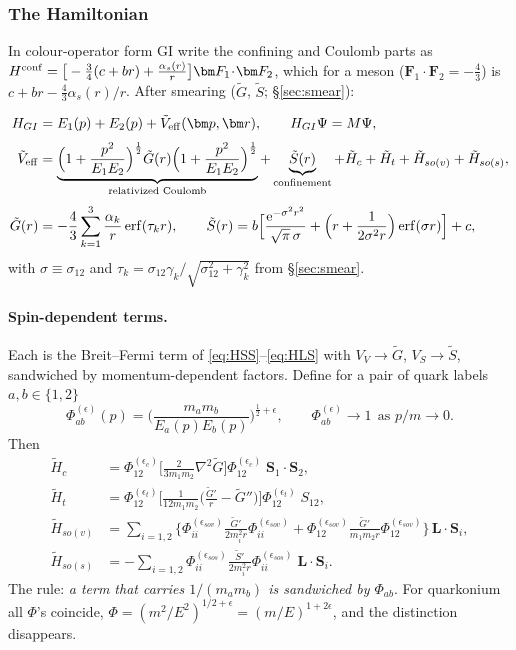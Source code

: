 \documentclass[11pt,a4paper]{article}
\numberwithin{equation}{section}
\theoremstyle{definition}
\theoremstyle{plain}
\theoremstyle{remark}
\newenvironment{keyresult}[1][Key result]{\begin{tcolorbox}[keybox,title={\small\bfseries #1},fonttitle=\small,coltitle=white,colbacktitle=MidnightBlue!70]}{\end{tcolorbox}}
\numberwithin{algorithm}{section}
\newcommand{\vr}{\bm r}
\newcommand{\vp}{\bm p}
\newcommand{\vL}{\bm L}
\newcommand{\vS}{\bm S}
\newcommand{\vF}{\bm F}
\newcommand{\as}{\alpha_s}
\newcommand{\ee}{\mathrm{e}}
\newcommand{\erf}{\operatorname{erf}}
\begin{document}
\subsubsection{The Hamiltonian}
In colour-operator form GI write the confining and Coulomb parts as
$H^{\rm conf}=\big[-\tfrac34(c+br)+\frac{\as(r)}{r}\big]\vF_1\!\cdot\!\vF_2$, which for a meson ($\vF_1\!\cdot\!\vF_2=-\tfrac43$) is $c+br-\tfrac43\as(r)/r$.
After smearing ($\tilde G$, $\tilde S$; \S\ref{sec:smear}):
\begin{keyresult}[Model C: Godfrey--Isgur Hamiltonian, meson rest frame]
\begin{align}
H_{GI}&=E_1(p)+E_2(p)+\tilde V_{\rm eff}(\vp,\vr),\qquad H_{GI}\Psi=M\Psi,\label{eq:HGI}\\[1mm]
\tilde V_{\rm eff}&=\underbrace{\Big(1+\frac{p^2}{E_1E_2}\Big)^{\frac12}\tilde G(r)\Big(1+\frac{p^2}{E_1E_2}\Big)^{\frac12}}_{\text{relativized Coulomb}}
+\underbrace{\tilde S(r)}_{\text{confinement}}
+\tilde H_{c}+\tilde H_{t}+\tilde H_{so(v)}+\tilde H_{so(s)},\\[1mm]
\tilde G(r)&=-\frac43\sum_{k=1}^3\frac{\alpha_k}{r}\erf(\tau_kr),\qquad
\tilde S(r)=b\Big[\frac{\ee^{-\sigma^2r^2}}{\sqrt\pi\,\sigma}+\Big(r+\frac{1}{2\sigma^2r}\Big)\erf(\sigma r)\Big]+c,
\end{align}
with $\sigma\equiv\sigma_{12}$ and $\tau_k=\sigma_{12}\gamma_k/\sqrt{\sigma_{12}^2+\gamma_k^2}$ from \S\ref{sec:smear}.
\end{keyresult}

\paragraph{Spin-dependent terms.} Each is the Breit--Fermi term of \eqref{eq:HSS}--\eqref{eq:HLS} with $V_V\to\tilde G$, $V_S\to\tilde S$, sandwiched by momentum-dependent factors. Define for a pair of quark labels $a,b\in\{1,2\}$
\begin{equation}
\Phi^{(\epsilon)}_{ab}(p)=\Big(\frac{m_am_b}{E_a(p)E_b(p)}\Big)^{\frac12+\epsilon},\qquad \Phi^{(\epsilon)}_{ab}\to1\ \ \text{as }p/m\to0.
\end{equation}
Then
\begin{align}
\tilde H_c&=\Phi^{(\epsilon_c)}_{12}\Big[\frac{2}{3m_1m_2}\nabla^2\tilde G\Big]\Phi^{(\epsilon_c)}_{12}\;\vS_1\!\cdot\!\vS_2,\\
\tilde H_t&=\Phi^{(\epsilon_t)}_{12}\Big[\frac{1}{12m_1m_2}\Big(\frac{\tilde G'}{r}-\tilde G''\Big)\Big]\Phi^{(\epsilon_t)}_{12}\;S_{12},\\
\tilde H_{so(v)}&=\sum_{i=1,2}\Big\{\Phi^{(\epsilon_{sov})}_{ii}\frac{\tilde G'}{2m_i^2r}\Phi^{(\epsilon_{sov})}_{ii}+\Phi^{(\epsilon_{sov})}_{12}\frac{\tilde G'}{m_1m_2r}\Phi^{(\epsilon_{sov})}_{12}\Big\}\,\vL\!\cdot\!\vS_i,\\
\tilde H_{so(s)}&=-\sum_{i=1,2}\Phi^{(\epsilon_{sos})}_{ii}\frac{\tilde S'}{2m_i^2r}\Phi^{(\epsilon_{sos})}_{ii}\;\vL\!\cdot\!\vS_i .
\end{align}
The rule: \emph{a term that carries $1/(m_am_b)$ is sandwiched by $\Phi_{ab}$}. For quarkonium all $\Phi$'s coincide, $\Phi=(m^2/E^2)^{1/2+\epsilon}=(m/E)^{1+2\epsilon}$, and the distinction disappears.
\end{document}
